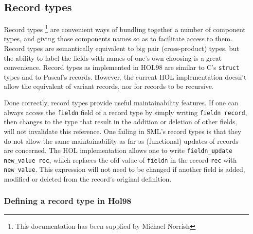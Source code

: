 \subsection{Record types}

Record types \footnote{This documentation has been supplied by Michael
Norrish} are convenient ways of bundling together a number of component
types, and giving those components names so as to facilitate access to
them.  Record types are semantically equivalent to big pair
(cross-product) types, but the ability to label the fields with names of
one's own choosing is a great convenience.  Record types as implemented
in HOL98 are similar to C's {\tt struct} types and to Pascal's records.
However, the current HOL implementation doesn't allow the equivalent of
variant records, nor for records to be recursive.

Done correctly, record types provide useful maintainability features.
If one can always access the {\tt fieldn} field of a record type by
simply writing {\tt fieldn record}, then changes to the type that
result in the addition or deletion of other fields, will not
invalidate this reference.  One failing in SML's record types is that
they do not allow the same maintainability as far as (functional)
updates of records are concerned.  The HOL implementation allows one
to write {\tt fieldn\_update new\_value rec}, which replaces the old
value of {\tt fieldn} in the record {\tt rec} with {\tt new\_value}.
This expression will not need to be changed if another field is added,
modified or deleted from the record's original definition.

\subsubsection{Defining a record type in Hol98}

